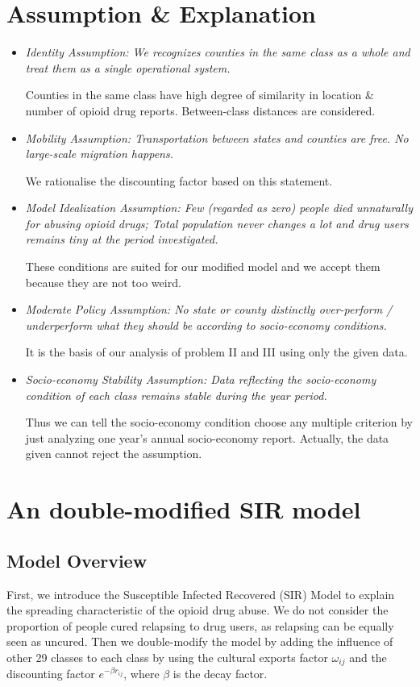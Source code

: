 \documentclass{mcmthesis}
\begin{document}
\section{Assumption \& Explanation}
\begin{itemize}
	\item  \emph{Identity Assumption: We recognizes counties in the same class as a whole and treat them as a single operational system.}  
	
	\small{Counties in the same class have high degree of similarity in location \& number of opioid drug reports. Between-class distances are considered.}
	\item \emph{Mobility Assumption: Transportation between states and counties are free. No  large-scale migration happens.} 
	
	\small{We rationalise the discounting factor based on this statement.}
	\item \emph{Model Idealization Assumption: Few (regarded as zero) people died unnaturally for abusing opioid drugs; Total population never changes a lot and drug users remains tiny at the period investigated.}
	
	\small{These conditions are suited for our modified model and we accept them because they are not too weird.}
	\item \emph{Moderate Policy Assumption: No state or county distinctly over-perform / underperform what they should be according to socio-economy conditions.}
	
	\small{It is the basis of our analysis of problem II and III using only the given data.}
	\item \emph{Socio-economy Stability Assumption: Data reflecting the socio-economy condition of each class remains stable during the year period.}
	
	\small{Thus we can tell the socio-economy condition choose any multiple criterion by just analyzing one year's annual socio-economy report. Actually, the data given cannot reject the assumption.}
\end{itemize}




\section{An double-modified SIR model}
\subsection{Model Overview}
First, we introduce the Susceptible Infected Recovered (SIR) Model to explain the spreading characteristic of the opioid drug abuse. We do not consider the proportion of people cured relapsing to drug users, as relapsing can be equally seen as uncured. Then we double-modify the model by adding the influence of other 29 classes to each class by using the cultural exports factor $\omega_{ij}$ and the discounting factor $e^{-\beta r_{ij}}$, where $\beta$ is the decay factor.
\end{document}
